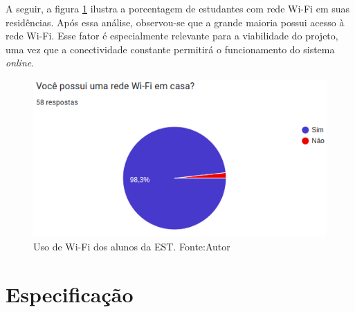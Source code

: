 A seguir, a figura \ref{figWifiAlunos} ilustra a porcentagem de estudantes com rede Wi-Fi em suas residências. Após essa análise, observou-se que 
a grande maioria possui acesso à rede Wi-Fi. Esse fator é especialmente relevante para a viabilidade do projeto, uma vez que a conectividade 
constante permitirá o funcionamento do sistema \textit{online}.

\begin{figure}[ht]
    \centering
    \includegraphics[width=.67\textwidth]{img/graf1-wifi.png}
    \caption{Uso de Wi-Fi dos alunos da EST. Fonte:Autor}\label{figWifiAlunos}
\end{figure}

\section{Especificação}\label{fase2}

